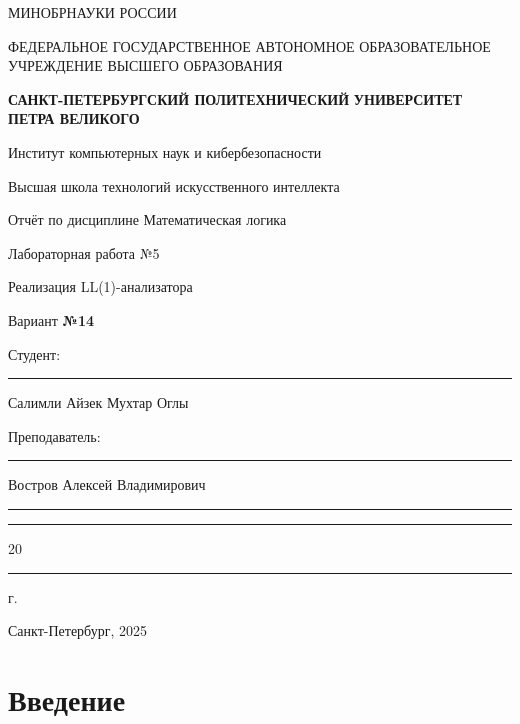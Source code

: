 \documentclass[areasetadvanced]{scrartcl}
\begin{document}
\sloppy
	\thispagestyle{empty}
	\begin{center}
		\large{МИНОБРНАУКИ РОССИИ} \par
		\vspace{0.3cm}
		\normalsize
		{ФЕДЕРАЛЬНОЕ ГОСУДАРСТВЕННОЕ АВТОНОМНОЕ ОБРАЗОВАТЕЛЬНОЕ УЧРЕЖДЕНИЕ ВЫСШЕГО ОБРАЗОВАНИЯ} \par
		\vspace{0.3cm}
		\textbf{\guillemotleft САНКТ-ПЕТЕРБУРГСКИЙ ПОЛИТЕХНИЧЕСКИЙ}
		\textbf{УНИВЕРСИТЕТ ПЕТРА ВЕЛИКОГО\guillemotright} \par
		\vspace{0.3cm}
		{Институт компьютерных наук и кибербезопасности}\par
		{Высшая школа технологий искусственного интеллекта}\par
	\end{center}
	\vfill
	\begin{center}
		{\large Отчёт по дисциплине \guillemotleft Математическая логика\guillemotright}\par
		{\huge   Лабораторная работа №5 
		
		\guillemotleft Реализация LL(1)-анализатора\guillemotright}\par
            {\huge Вариант \textbf{№14}}
         
	\end{center}
	\vfill
	\begin{flushleft}
		Студент: \hspace{1.8cm} \rule[0pt]{2.5cm}{0.5pt}\hfill Салимли Айзек Мухтар Оглы\par
		\vspace{1.5cm}
		Преподаватель: \hspace{0.55cm} \rule[0pt]{2.5cm}{0.5pt}\hfill  Востров Алексей Владимирович
	\end{flushleft}
	\vspace{0.5cm}
	\begin{flushright}
		\guillemotleft \rule[0pt]{0.8cm}{0.5pt}\guillemotright \rule[0pt]{2cm}{0.5pt} 20\rule[0pt]{0.5cm}{0.5pt} г.
	\end{flushright}
	\vfill
	\begin{center}
		Санкт-Петербург, 2025
	\end{center}
	\newpage
	\tableofcontents
	\newpage
\section*{Введение}
\end{document}
